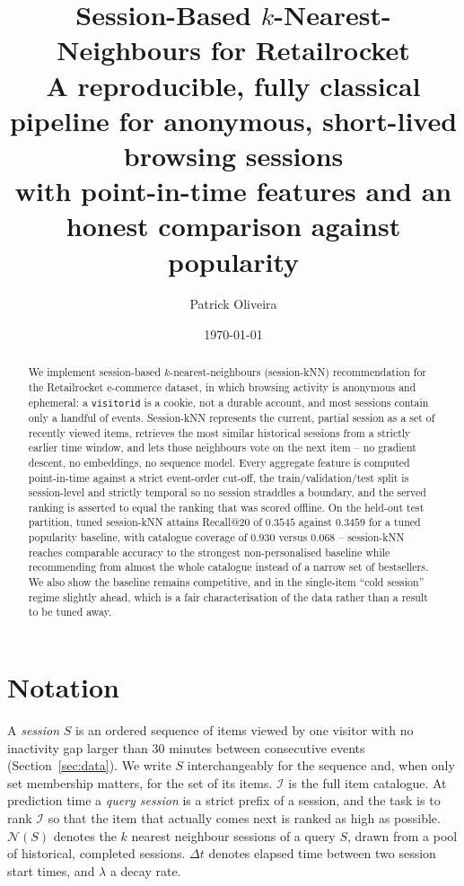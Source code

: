 \documentclass[11pt,a4paper]{article}
\title{\textbf{Session-Based $k$-Nearest-Neighbours for Retailrocket}\\[0.4em]
\large A reproducible, fully classical pipeline for anonymous,
short-lived browsing sessions\\
with point-in-time features and an honest comparison against popularity}
\author{Patrick Oliveira}
\date{\today}
\newcommand{\Sset}{S}
\newcommand{\Iset}{\mathcal{I}}
\newcommand{\Nhood}{\mathcal{N}}
\begin{document}
\maketitle

\begin{abstract}
We implement session-based $k$-nearest-neighbours (session-kNN) recommendation
for the Retailrocket e-commerce dataset, in which browsing activity is
anonymous and ephemeral: a \texttt{visitorid} is a cookie, not a durable
account, and most sessions contain only a handful of events. Session-kNN
represents the current, partial session as a set of recently viewed items,
retrieves the most similar historical sessions from a strictly earlier time
window, and lets those neighbours vote on the next item -- no gradient
descent, no embeddings, no sequence model. Every aggregate feature is
computed point-in-time against a strict event-order cut-off, the
train/validation/test split is session-level and strictly temporal so no
session straddles a boundary, and the served ranking is asserted to equal the
ranking that was scored offline. On the held-out test partition, tuned
session-kNN attains Recall@20 of $0.3545$ against $0.3459$ for a tuned
popularity baseline, with catalogue coverage of $0.930$ versus $0.068$ --
session-kNN reaches comparable accuracy to the strongest non-personalised
baseline while recommending from almost the whole catalogue instead of a
narrow set of bestsellers. We also show the baseline remains competitive, and
in the single-item ``cold session'' regime slightly ahead, which is a fair
characterisation of the data rather than a result to be tuned away.
\end{abstract}

\tableofcontents
\newpage

\section{Notation}
\label{sec:notation}

A \emph{session} $\Sset$ is an ordered sequence of items viewed by one
visitor with no inactivity gap larger than $30$ minutes between consecutive
events (Section~\ref{sec:data}). We write $\Sset$ interchangeably for the
sequence and, when only set membership matters, for the set of its items.
$\Iset$ is the full item catalogue. At prediction time a \emph{query session}
is a strict prefix of a session, and the task is to rank $\Iset$ so that the
item that actually comes next is ranked as high as possible. $\Nhood(\Sset)$
denotes the $k$ nearest neighbour sessions of a query $\Sset$, drawn from a
pool of historical, completed sessions. $\Delta t$ denotes elapsed time
between two session start times, and $\lambda$ a decay rate.











\end{document}
